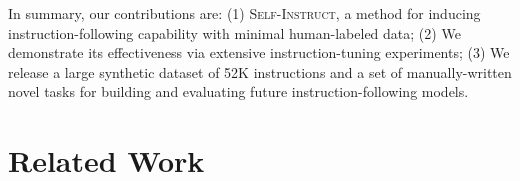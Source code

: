 \documentclass[11pt]{article}
\newcommand{\todo}[1]{{\color{red} [TODO: {#1}]}}
\newcommand{\yeganeh}[1]{\textcolor{magenta}{[YK: #1]}}
\newcommand{\swaroop}[1]{\textcolor{cyan}{[SM: #1]}}
\newcommand{\daniel}[1]{\textcolor{blue}{[DK: #1]}}
\newcommand{\nascomment}[1]{\textcolor{blue}{\textbf{[#1 -- \textsc{nas}]}}}
\newcommand{\alisa}[1]{\textcolor{purple}{\textbf{[#1 -- \textsc{al}]}}}
\newcommand{\name}{\textsc{Self-Instruct}}
\newcommand{\dataset}{\textsc{Diverse-Instructions}} %
\newcommand{\gptthree}{\textsc{GPT3}}
\begin{document}


In summary, our contributions are: (1) \name, a method for inducing instruction-following capability 
with minimal human-labeled data;
(2) We demonstrate its effectiveness via extensive instruction-tuning experiments; 
(3) We release a large synthetic dataset of 52K instructions and a set of manually-written novel tasks for building and evaluating future instruction-following models.




\section{Related Work}
\label{sec:related}


\end{document}
